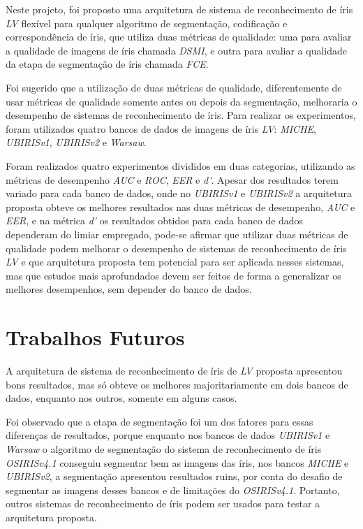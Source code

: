 
\par Neste projeto, foi proposto uma arquitetura de sistema de reconhecimento de íris \textit{\acrshort{LV}} flexível para qualquer algoritmo de segmentação, codificação e correspondência de íris, que utiliza duas métricas de qualidade: uma para avaliar a qualidade de imagens de íris chamada \textit{\acrshort{DSMI}}, e outra para avaliar a qualidade da etapa de segmentação de íris chamada \textit{\acrshort{FCE}}. 

\par Foi sugerido que a utilização de duas métricas de qualidade, diferentemente de usar métricas de qualidade somente antes ou depois da segmentação, melhoraria o desempenho de sistemas de reconhecimento de íris. Para realizar os experimentos, foram utilizados quatro bancos de dados de imagens de íris \textit{\acrshort{LV}}: \textit{MICHE}, \textit{UBIRISv1}, \textit{UBIRISv2} e \textit{\acrfull{Warsaw}}. 

\par Foram realizados quatro experimentos divididos em duas categorias, utilizando as métricas de desempenho \textit{\acrshort{AUC}} e \textit{\acrshort{ROC}}, \textit{\acrshort{EER}} e \textit{\acrshort{d'}}. Apesar dos resultados terem variado para cada banco de dados, onde no \textit{UBIRISv1} e \textit{UBIRISv2} a arquitetura proposta obteve os melhores resultados nas duas métricas de desempenho, \textit{\acrshort{AUC}} e \textit{\acrshort{EER}}, e na métrica \textit{\acrshort{d'}} os resultados obtidos para cada banco de dados dependeram do limiar empregado, pode-se afirmar que utilizar duas métricas de qualidade podem melhorar o desempenho de sistemas de reconhecimento de íris \textit{\acrshort{LV}} e que arquitetura proposta tem potencial para ser aplicada nesses sistemas, mas que estudos mais aprofundados devem ser feitos de forma a generalizar os melhores desempenhos, sem depender do banco de dados.

\section{Trabalhos Futuros} \label{sec:conclusao:trabalhos_futuros}

\par A arquitetura de sistema de reconhecimento de íris de \textit{\acrshort{LV}} proposta apresentou bons resultados, mas só obteve os melhores majoritariamente em dois bancos de dados, enquanto nos outros, somente em alguns casos.

\par Foi observado que a etapa de segmentação foi um dos fatores para essas diferenças de resultados, porque enquanto nos bancos de dados \textit{UBIRISv1} e \textit{\acrshort{Warsaw}} o algoritmo de segmentação do sistema de reconhecimento de íris \textit{OSIRISv4.1} conseguiu segmentar bem as imagens das íris, nos bancos \textit{MICHE} e \textit{UBIRISv2}, a segmentação apresentou resultados ruins, por conta do desafio de segmentar as imagens desses bancos e de limitações do \textit{OSIRISv4.1}. Portanto, outros sistemas de reconhecimento de íris podem ser usados para testar a arquitetura proposta.

